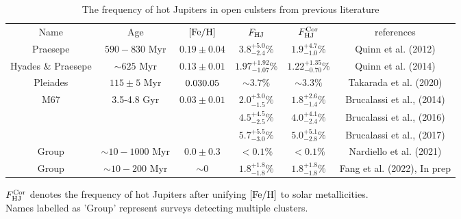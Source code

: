 \documentclass[twocolumn]{pnas-new}
\begin{document}
\begin{table*}[!t]
\renewcommand\arraystretch{1.2}
\centering
\caption{The frequency of hot Jupiters in open culsters from previous literature}
{\footnotesize
\label{tab:FHJClusters}
\begin{tabular}{c|c|c|c|c|c} \hline
    Name & Age & $\rm [Fe/H]$ & $F_{\rm HJ}$ & $F^{\rm Cor}_{\rm HJ}$ & references \\
    Praesepe & $590-830$ Myr & $0.19 \pm 0.04$ & $3.8^{+5.0}_{-2.4}\%$ & $1.9^{+4.7}_{-1.0} \%$  & Quinn et al. (2012) \\
    Hyades \& Praesepe & $\sim 625$ Myr & $0.13 \pm 0.01$ & $1.97^{+1.92}_{-1.07}\%$ & $1.22^{+1.35}_{-0.70}\%$ & Quinn et al. (2014) \\
    Pleiades & $115 \pm 5$ Myr  & $0.03 \rm 0.05$ &  $\sim 3.7\%$  & $\sim 3.3\%$  & Takarada et al. (2020) \\
    \multirow{3}{*}{M67} & \multirow{3}{*}{3.5-4.8 Gyr} & \multirow{3}{*}{$0.03 \pm 0.01$} & $2.0^{+3.0}_{-1.5}\%$ & $1.8^{+2.6}_{-1.4}\%$ & Brucalassi et al., (2014) \\
    &  &  & $4.5^{+4.5}_{-2.5}\%$ & $4.0^{+4.1}_{-2.4}\%$ & Brucalassi et al., (2016) \\
    &  &  &  $5.7^{+5.5}_{-3.0}\%$ & $5.0^{+5.1}_{-2.8}\%$ & Brucalassi et al., (2017) \\
    Group &  $\sim 10-1000$ Myr & $0.0 \pm 0.3$ & $<0.1\%$ & $<0.1\%$ & Nardiello et al. (2021) \\
    Group & $\sim 10-200$ Myr & $\sim 0$ & $1.8^{+1.8}_{-1.8}\%$ & $1.8^{+1.8}_{-1.8}\%$ & Fang et al. (2022), In prep \\ \hline  
\end{tabular}}
\flushleft
{$F^{\rm Cor}_{\rm HJ}$ denotes the frequency of hot Jupiters after unifying $\rm [Fe/H]$ to solar metallicities. \\
Names labelled as 'Group' represent surveys detecting multiple clusters.}  
\end{table*}







\end{document}
